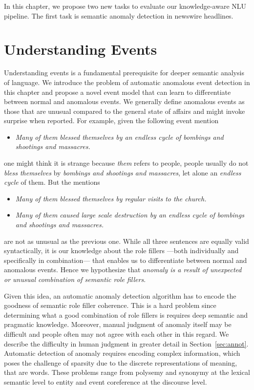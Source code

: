 In this chapter, we propose two new tasks to evaluate our knowledge-aware NLU pipeline. The first task is semantic anomaly detection in newswire headlines.

\section{Understanding Events}
Understanding events is a fundamental prerequisite for deeper semantic 
analysis of language.  We introduce the problem of automatic anomalous event
detection
in this chapter and propose a novel event model that can learn to differentiate
between normal
and anomalous events.  We generally define anomalous events as those that are
unusual compared
to the general state of affairs and might invoke surprise when reported.  For
example, given the 
following event mention 
\begin{itemize}
 \item[] \textit{Many of them blessed themselves by an endless cycle of bombings
and  shootings and massacres.}
\end{itemize}
one might think it is strange because \textit{them} refers to people, people
usually do not \textit{bless themselves} by \textit{bombings and
shootings 
and massacres}, let alone an \textit{endless cycle} of them.  But the mentions
\begin{itemize}
 \item[] \textit{Many of them blessed themselves by regular visits to the
church.}
 \item[] \textit{Many of them caused large scale destruction by an endless cycle
of bombings and shootings and massacres.}
\end{itemize}
are not as unusual as the previous one.  While all three sentences are equally
valid syntactically, it 
is our knowledge about the role fillers 
---both individually and specifically in combination---  
that enables us to 
differentiate between normal and anomalous events.  Hence we hypothesize that
\emph{anomaly is a result of unexpected or 
unusual combination of semantic role fillers}.

Given this idea, an automatic
anomaly detection algorithm has to encode
the goodness of semantic role filler coherence.  This is a hard problem since
determining what a good combination of role fillers is 
requires deep semantic and pragmatic knowledge.  
Moreover, manual judgment of anomaly itself may be difficult and people often
may not agree with each other in this
regard.  We describe the difficulty in human judgment in greater detail in
Section~\ref{sec:annot}.  
Automatic detection of anomaly requires encoding complex information, which
poses the challenge of sparsity
due to the discrete representations of meaning, that are words.  These problems
range from polysemy and synonymy at the 
lexical semantic level to entity and event coreference at the discourse level.

